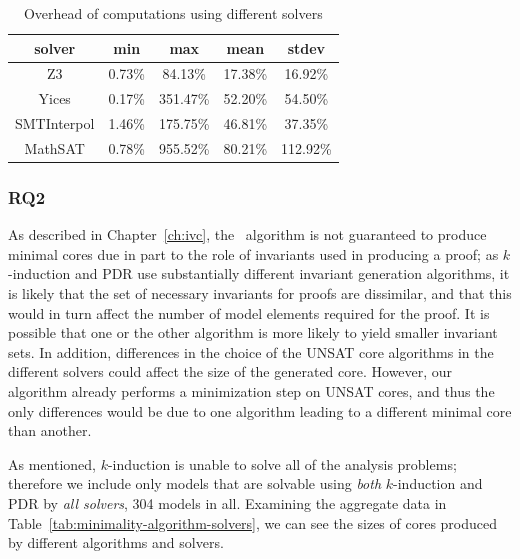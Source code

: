 \begin{table}
  \caption{Overhead of \ucalg computations using different solvers}
  \centering
  \begin{tabular}{ |c||c|c|c|c| }
    \hline
     solver & min & max & mean & stdev \\[0.5ex]
    \hline
    Z3   & 0.73\% & 84.13\% & 17.38\% & 16.92\% \\[0.5ex]
    Yices &   0.17\%  & 351.47\%   & 52.20\% & 54.50\% \\[0.5ex]
   SMTInterpol& 1.46\% & 175.75\% &  46.81\% & 37.35\%\\[0.5ex]
    MathSAT & 0.78\% & 955.52\% &  80.21\% & 112.92\%\\[0.5ex]
    \hline
  \end{tabular}
  \label{tab:overhead-ucalg-solvers}
\end{table}

\vspace{0.1in}
\subsubsection{RQ2}
As described in Chapter~\ref{ch:ivc}, the \ucalg\
algorithm is not guaranteed to produce minimal cores due in part to
the role of invariants used in producing a proof; as $k$-induction and
PDR use substantially different invariant generation algorithms, it is
likely that the set of necessary invariants for proofs are dissimilar,
and that this would in turn affect the number of model elements required for
the proof.  It is possible that one or the other algorithm is more likely
to yield smaller invariant sets.  In addition, differences in the choice of the
UNSAT core algorithms in the different solvers could affect the size of the
generated core. However, our algorithm already performs a minimization
step on UNSAT cores, and thus the only differences would be due to one
algorithm leading to a different minimal core than another.

As mentioned, $k$-induction is unable to solve all of the analysis problems; therefore we include only models that are solvable using {\em both} $k$-induction and PDR by {\em all solvers}, 304 models in all.  Examining the aggregate data in Table~\ref{tab:minimality-algorithm-solvers}, we can see the sizes of cores produced by different algorithms and solvers.
\vspace{0.1in}
